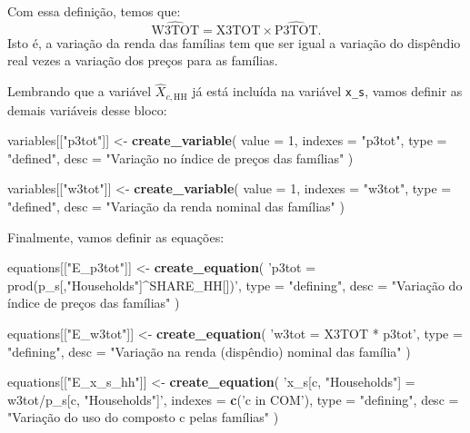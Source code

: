 \documentclass[12pt,twoside]{article}
\newenvironment{Shaded}{\begin{snugshade}}{\end{snugshade}}
\newcommand{\DataTypeTok}[1]{\textcolor[rgb]{0.13,0.29,0.53}{#1}}
\newcommand{\DecValTok}[1]{\textcolor[rgb]{0.00,0.00,0.81}{#1}}
\newcommand{\KeywordTok}[1]{\textcolor[rgb]{0.13,0.29,0.53}{\textbf{#1}}}
\newcommand{\NormalTok}[1]{#1}
\newcommand{\StringTok}[1]{\textcolor[rgb]{0.31,0.60,0.02}{#1}}
\let\oldShaded\Shaded
\let\endoldShaded\endShaded
\renewenvironment{Shaded}{\footnotesize\oldShaded}{\endoldShaded}
\begin{document}
Com essa definição, temos que:
\[\hat{\text{W3TOT}} = \hat{\text{X3TOT}} \times \hat{\text{P3TOT}}.\]
Isto é, a variação da renda das famílias tem que ser igual a variação do
dispêndio real vezes a variação dos preços para as famílias.

Lembrando que a variável \(\hat{X}_{c,\text{HH}}\) já está incluída na
variável \texttt{x\_s}, vamos definir as demais variáveis desse bloco:

\begin{Shaded}
\begin{Highlighting}[]
\NormalTok{variables[[}\StringTok{"p3tot"}\NormalTok{]] <-}\StringTok{ }\KeywordTok{create_variable}\NormalTok{(}
  \DataTypeTok{value =} \DecValTok{1}\NormalTok{,}
  \DataTypeTok{indexes =} \StringTok{"p3tot"}\NormalTok{,}
  \DataTypeTok{type =} \StringTok{"defined"}\NormalTok{,}
  \DataTypeTok{desc =} \StringTok{"Variação no índice de preços das famílias"}
\NormalTok{)}

\NormalTok{variables[[}\StringTok{"w3tot"}\NormalTok{]] <-}\StringTok{ }\KeywordTok{create_variable}\NormalTok{(}
  \DataTypeTok{value =} \DecValTok{1}\NormalTok{,}
  \DataTypeTok{indexes =} \StringTok{"w3tot"}\NormalTok{,}
  \DataTypeTok{type =} \StringTok{"defined"}\NormalTok{,}
  \DataTypeTok{desc =} \StringTok{"Variação da renda nominal das famílias"}
\NormalTok{)}
\end{Highlighting}
\end{Shaded}

Finalmente, vamos definir as equações:

\begin{Shaded}
\begin{Highlighting}[]
\NormalTok{equations[[}\StringTok{"E_p3tot"}\NormalTok{]] <-}\StringTok{ }\KeywordTok{create_equation}\NormalTok{(}
  \StringTok{'p3tot = prod(p_s[,"Households"]^SHARE_HH[])'}\NormalTok{,}
  \DataTypeTok{type =} \StringTok{"defining"}\NormalTok{,}
  \DataTypeTok{desc =} \StringTok{"Variação do índice de preços das famílias"}
\NormalTok{)}

\NormalTok{equations[[}\StringTok{"E_w3tot"}\NormalTok{]] <-}\StringTok{ }\KeywordTok{create_equation}\NormalTok{(}
  \StringTok{'w3tot = X3TOT * p3tot'}\NormalTok{,}
  \DataTypeTok{type =} \StringTok{"defining"}\NormalTok{,}
  \DataTypeTok{desc =} \StringTok{"Variação na renda (dispêndio) nominal das família"}
\NormalTok{)}

\NormalTok{equations[[}\StringTok{"E_x_s_hh"}\NormalTok{]] <-}\StringTok{ }\KeywordTok{create_equation}\NormalTok{(}
  \StringTok{'x_s[c, "Households"] = w3tot/p_s[c, "Households"]'}\NormalTok{,}
  \DataTypeTok{indexes =} \KeywordTok{c}\NormalTok{(}\StringTok{'c in COM'}\NormalTok{),}
  \DataTypeTok{type =} \StringTok{"defining"}\NormalTok{,}
  \DataTypeTok{desc =} \StringTok{"Variação do uso do composto c pelas famílias"}
\NormalTok{)}
\end{Highlighting}
\end{Shaded}
\end{document}
